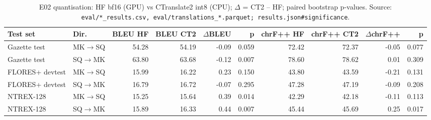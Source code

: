 \begin{table}[t]
\centering
\small
\begin{tabular}{llrrrrrrrr}
\toprule
Test set & Dir. & BLEU HF & BLEU CT2 & $\Delta$BLEU & p & chrF++ HF & chrF++ CT2 & $\Delta$chrF++ & p \\
\midrule
Gazette test & MK$\rightarrow$SQ & 54.28 & 54.19 & -0.09 & 0.059 & 72.42 & 72.37 & -0.05 & 0.077 \\
Gazette test & SQ$\rightarrow$MK & 63.80 & 63.68 & -0.12 & 0.007 & 78.60 & 78.62 & 0.01 & 0.309 \\
FLORES+ devtest & MK$\rightarrow$SQ & 15.99 & 16.22 & 0.23 & 0.150 & 43.80 & 43.59 & -0.21 & 0.131 \\
FLORES+ devtest & SQ$\rightarrow$MK & 16.79 & 16.72 & -0.07 & 0.295 & 47.28 & 47.19 & -0.09 & 0.208 \\
NTREX-128 & MK$\rightarrow$SQ & 15.25 & 15.64 & 0.39 & 0.014 & 42.29 & 42.18 & -0.11 & 0.113 \\
NTREX-128 & SQ$\rightarrow$MK & 15.89 & 16.33 & 0.44 & 0.007 & 45.44 & 45.69 & 0.25 & 0.017 \\
\bottomrule
\end{tabular}
\caption{E02 quantisation: HF bf16 (GPU) vs CTranslate2 int8 (CPU); $\Delta$ = CT2 -- HF; paired bootstrap p-values. Source: \texttt{eval/*\_results.csv, eval/translations\_*.parquet; results.json\#significance}.}
\label{tab:e02-quantisation}
\end{table}

